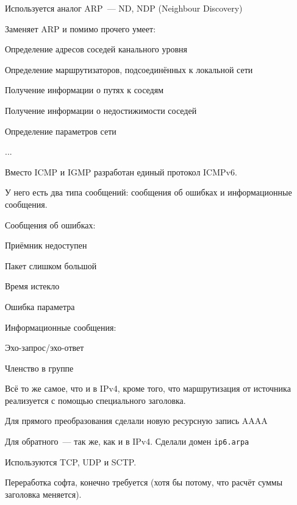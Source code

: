 
Используется аналог ARP~--- ND, NDP (Neighbour Discovery)

Заменяет ARP и помимо прочего умеет:
\begin{MyItemize}
    \item Определение адресов соседей канального уровня
    \item Определение маршрутизаторов, подсоединённых к локальной сети
    \item Получение информации о путях к соседям
    \item Получение информации о недостижимости соседей
    \item Определение параметров сети
    \item ...
\end{MyItemize}


Вместо ICMP и IGMP разработан единый протокол ICMPv6.

У него есть два типа сообщений: сообщения об ошибках и информационные сообщения.

Сообщения об ошибках:
\begin{MyItemize}
    \item Приёмник недоступен
    \item Пакет слишком большой
    \item Время истекло
    \item Ошибка параметра
\end{MyItemize}

Информационные сообщения:
\begin{MyItemize}
    \item Эхо-запрос/эхо-ответ
    \item Членство в группе
\end{MyItemize}


Всё то же самое, что и в IPv4, кроме того, что маршрутизация от источника реализуется с помощью специального заголовка.


Для прямого преобразования сделали новую ресурсную запись AAAA

Для обратного~--- так же, как и в IPv4. Сделали домен {\tt ip6.arpa}


Используются TCP, UDP и SCTP.

Переработка софта, конечно требуется (хотя бы потому, что расчёт суммы заголовка меняется).

